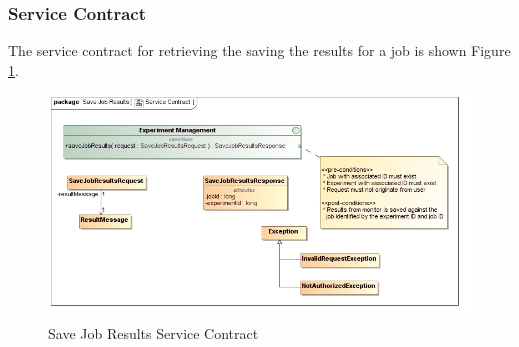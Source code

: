 \subsubsection{Service Contract}
The service contract for retrieving the saving the results for a job is shown 
Figure \ref{fig:saveJobResultsServiceContract}.
\begin{figure}[H]
  \begin{center}
  \includegraphics[scale=0.38]{../Diagrams and Charts/Experiment/Save Job Results Service Contract.jpg}
  \caption{Save Job Results Service Contract}
  \label{fig:saveJobResultsServiceContract}
  \end{center}
\end{figure}
